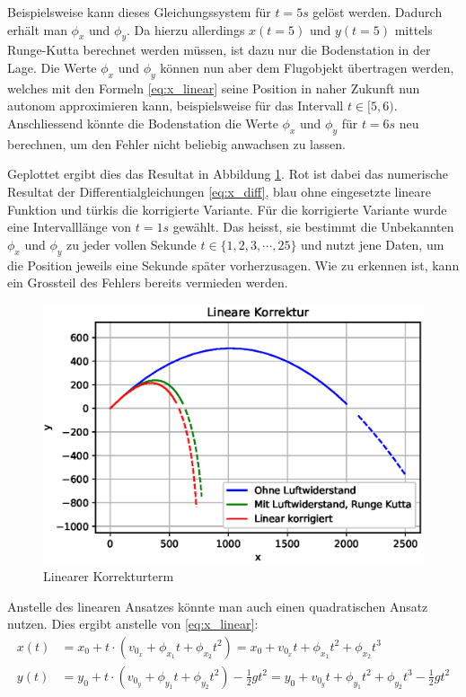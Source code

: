 Beispielsweise kann dieses Gleichungssystem für $t = 5s$ gelöst werden. Dadurch erhält man $\phi_x$ und $\phi_y$. Da hierzu allerdings $x(t=5)$ und $y(t=5)$ mittels Runge-Kutta berechnet werden müssen, ist dazu nur die Bodenstation in der Lage. 
Die Werte $\phi_x$ und $\phi_y$ können nun aber dem Flugobjekt übertragen werden, welches mit den Formeln \eqref{eq:x_linear} seine Position in naher Zukunft nun autonom approximieren kann, beispielsweise für das Intervall $t \in [5,6)$. Anschliessend könnte die Bodenstation die Werte $\phi_x$ und $\phi_y$ für $t=6s$ neu berechnen, um den Fehler nicht beliebig anwachsen zu lassen.

Geplottet ergibt dies das Resultat in Abbildung \ref{naive_linear_term}. Rot ist dabei das numerische Resultat der Differentialgleichungen \eqref{eq:x_diff}, blau ohne eingesetzte lineare Funktion und türkis die korrigierte Variante. Für die korrigierte Variante wurde eine Intervalllänge von $t=1s$ gewählt. Das heisst, sie bestimmt die Unbekannten $\phi_x$ und $\phi_y$ zu jeder vollen Sekunde $t \in \{1, 2, 3, \cdots, 25\}$ und nutzt jene Daten, um die Position jeweils eine Sekunde später vorherzusagen. 
Wie zu erkennen ist, kann ein Grossteil des Fehlers bereits vermieden werden.
\begin{figure}
    \centering
    \includegraphics[scale=0.7]{papers/perturbation/bilder/perturbation_fig1.eps}
    \caption{Linearer Korrekturterm}
	\label{naive_linear_term}
\end{figure}


Anstelle des linearen Ansatzes könnte man auch einen quadratischen Ansatz nutzen. Dies ergibt anstelle von \eqref{eq:x_linear}:
\begin{equation}
\begin{aligned}
x(t) &= x_0 + t \cdot (v_{0_x} + \phi_{x_1}t + \phi_{x_2}t^2) = x_0 + v_{0_x}t + \phi_{x_1}t^2 + \phi_{x_2}t^3\\
y(t) &= y_0 + t \cdot (v_{0_y} + \phi_{y_1}t + \phi_{y_2}t^2) - \frac{1}{2}gt^2 = y_0 + v_{0_y}t + \phi_{y_1}t^2 + \phi_{y_2}t^3 - \frac{1}{2}gt^2
\end{aligned}
\end{equation}


